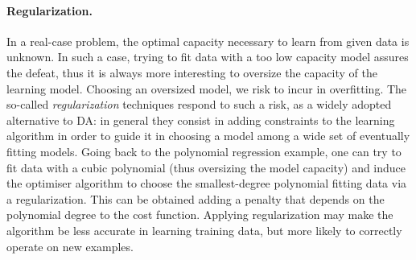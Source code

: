 \begin{figure}
\end{figure}

\paragraph*{Regularization.}
In a real-case problem, the optimal capacity necessary to learn from given data is unknown. In such a case, trying to fit data with a too low capacity model assures the defeat, thus it is always more interesting to oversize the capacity of the learning model. Choosing an oversized model, we risk to incur in overfitting. The so-called \emph{regularization} techniques respond to such a risk, as a widely adopted alternative to DA: in general they consist in adding constraints to the learning algorithm in order to guide it in choosing a model among a wide set of eventually fitting models. Going back to the polynomial regression example, one can try to fit data with a cubic polynomial (thus oversizing the model capacity) and induce the optimiser algorithm to choose the smallest-degree polynomial fitting data via a regularization. This can be obtained adding a penalty that depends on the polynomial degree to the cost function. Applying regularization may make the algorithm be less accurate in learning training data, but more likely to correctly operate on new examples.

